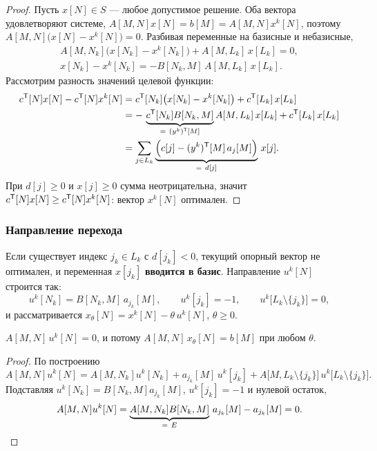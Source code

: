 \begin{proof}
Пусть $x[N] \in S$ — любое допустимое решение. Оба вектора удовлетворяют
системе, $A[M,N]x[N] = b[M] = A[M,N]x^k[N]$, поэтому
$A[M,N]\big(x[N] - x^k[N]\big) = 0$. Разбивая переменные на базисные и
небазисные,
\begin{gather*}
  A[M,N_k]\big(x[N_k] - x^k[N_k]\big) + A[M,L_k]\,x[L_k] = 0 , \\
  x[N_k] - x^k[N_k] = -B[N_k,M]\,A[M,L_k]\,x[L_k] .
\end{gather*}
Рассмотрим разность значений целевой функции:
\begin{align*}
  c\T[N]x[N] - c\T[N]x^k[N]
  &= c\T[N_k]\big(x[N_k] - x^k[N_k]\big) + c\T[L_k]\,x[L_k] \\
  &= -\,\underbrace{c\T[N_k]B[N_k,M]}_{=\ (y^k)\T[M]}A[M,L_k]\,x[L_k]
     + c\T[L_k]\,x[L_k] \\
  &= \sum_{j \in L_k}
     \underbrace{\Big(c[j] - (y^k)\T[M]\,a_j[M]\Big)}_{=\ d[j]}\, x[j] .
\end{align*}
При $d[j] \ge 0$ и $x[j] \ge 0$ сумма неотрицательна, значит
$c^{\mathsf{T}}[N]x[N] \ge c^{\mathsf{T}}[N]x^k[N]$: вектор $x^k[N]$ оптимален.
\end{proof}

\subsubsection*{Направление перехода}

Если существует индекс $j_k \in L_k$ с $d[j_k] < 0$, текущий опорный вектор не
оптимален, и переменная $x[j_k]$ \textbf{вводится в базис}. Направление
$u^k[N]$ строится так:
\[
  u^k[N_k] = B[N_k,M]\,a_{j_k}[M] ,
  \qquad
  u^k[j_k] = -1 ,
  \qquad
  u^k\big[L_k \setminus \{j_k\}\big] = 0 ,
\]
и рассматривается $x_\theta[N] = x^k[N] - \theta\,u^k[N]$, $\theta \ge 0$.

\begin{lemma}\label{lem:simplex-dir}
$A[M,N]\,u^k[N] = 0$, и потому $A[M,N]\,x_\theta[N] = b[M]$ при любом $\theta$.
\end{lemma}

\begin{proof}
По построению
\[
  A[M,N]u^k[N] = A[M,N_k]u^k[N_k] + a_{j_k}[M]\,u^k[j_k]
    + A\big[M, L_k \setminus \{j_k\}\big]\,u^k\big[L_k\setminus\{j_k\}\big] .
\]
Подставляя $u^k[N_k] = B[N_k,M]a_{j_k}[M]$, $u^k[j_k] = -1$ и нулевой остаток,
\[
  A[M,N]u^k[N] = \underbrace{A[M,N_k]B[N_k,M]}_{=\ E}\,a_{j_k}[M] - a_{j_k}[M] = 0 .
  \qedhere
\]
\end{proof}


